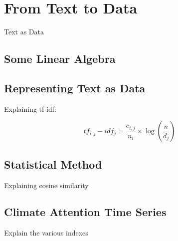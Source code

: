 \chapter{From Text to Data}


 Text as Data

\section{Some Linear Algebra}

\section{Representing Text as Data}

 Explaining tf-idf:

\begin{equation}
tf_{i,j} - idf_{j} = \frac{c_{i,j}}{n_i} \times \log (\frac{n}{d_j})
\end{equation}

\section{Statistical Method}

Explaining cosine similarity

\section{Climate Attention Time Series}

Explain the various indexes

